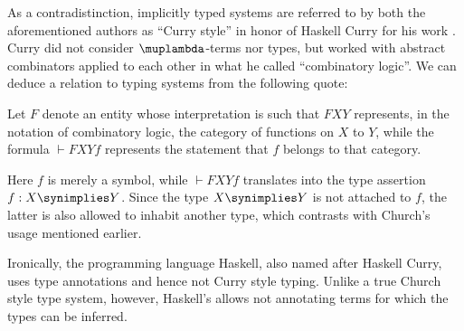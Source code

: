 \begin{remark}
  As a contradistinction, implicitly typed systems are referred to by both the aforementioned authors as \enquote{Curry style} in honor of Haskell Curry for his work \cite{Curry1934FunctionalityInCombinatoryLogic}. Curry did not consider \( \muplambda \)-terms nor types, but worked with abstract combinators applied to each other in what he called \enquote{combinatory logic}. We can deduce a relation to typing systems from the following quote:
  \begin{displayquote}
    Let \( F \) denote an entity whose interpretation is such that \( FXY \) represents, in the notation of combinatory logic, the category of functions on \( X \) to \( Y \), while the formula \( \vdash FXYf \) represents the statement that \( f \) belongs to that category.
  \end{displayquote}

  Here \( f \) is merely a symbol, while \( \vdash FXYf \) translates into the type assertion \( f: X \synimplies Y \). Since the type \( X \synimplies Y \) is not attached to \( f \), the latter is also allowed to inhabit another type, which contrasts with Church's usage mentioned earlier.

  Ironically, the programming language Haskell, also named after Haskell Curry, uses type annotations and hence not Curry style typing. Unlike a true Church style type system, however, Haskell's allows not annotating terms for which the types can be inferred.
\end{remark}

